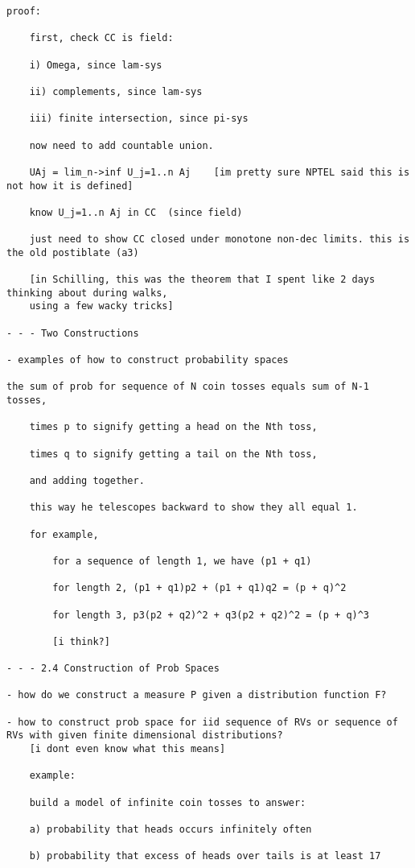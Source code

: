 \documentclass{article}
\begin{document}
\begin{flushleft}
\begin{verbatim}
proof:
	
	first, check CC is field:
	
	i) Omega, since lam-sys
	
	ii) complements, since lam-sys
	
	iii) finite intersection, since pi-sys
	
	now need to add countable union.
	
	UAj = lim_n->inf U_j=1..n Aj    [im pretty sure NPTEL said this is not how it is defined]
	
	know U_j=1..n Aj in CC  (since field)
	
	just need to show CC closed under monotone non-dec limits. this is the old postiblate (a3)
	
	[in Schilling, this was the theorem that I spent like 2 days thinking about during walks,
	using a few wacky tricks]
	
- - - Two Constructions

- examples of how to construct probability spaces

the sum of prob for sequence of N coin tosses equals sum of N-1 tosses, 

	times p to signify getting a head on the Nth toss,
	
	times q to signify getting a tail on the Nth toss, 
	
	and adding together.
	
	this way he telescopes backward to show they all equal 1. 
	
	for example, 
	
		for a sequence of length 1, we have (p1 + q1)
		
		for length 2, (p1 + q1)p2 + (p1 + q1)q2 = (p + q)^2
		
		for length 3, p3(p2 + q2)^2 + q3(p2 + q2)^2 = (p + q)^3
		
		[i think?]

- - - 2.4 Construction of Prob Spaces
		
- how do we construct a measure P given a distribution function F?
		
- how to construct prob space for iid sequence of RVs or sequence of RVs with given finite dimensional distributions?
	[i dont even know what this means]
	
	example:
	
	build a model of infinite coin tosses to answer:
	
	a) probability that heads occurs infinitely often 
	
	b) probability that excess of heads over tails is at least 17
	

\end{verbatim}
\end{flushleft}
\end{document}
